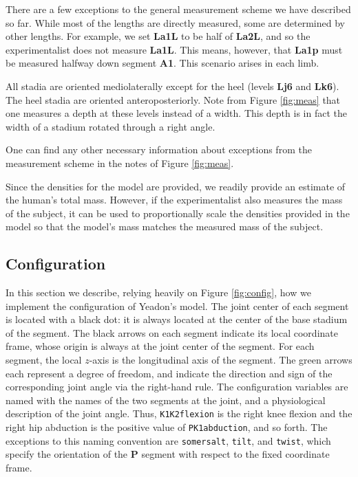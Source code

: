 \documentclass[10pt]{article}
\begin{document}
There are a few exceptions to the general measurement scheme we have described
so far. While most of the lengths are directly measured, some are determined by
other lengths. For example, we set \textbf{La1L} to be half of \textbf{La2L},
and so the experimentalist does not measure \textbf{La1L}. This means, however,
that \textbf{La1p} must be measured halfway down segment \textbf{A1}. This
scenario arises in each limb.

All stadia are oriented mediolaterally except for the heel (levels
\textbf{Lj6} and \textbf{Lk6}). The heel stadia are oriented anteroposteriorly.
Note from Figure \ref{fig:meas} that one measures a depth at these levels
instead of a width. This depth is in fact the width of a stadium rotated
through a right angle.

One can find any other necessary information about exceptions from the
measurement scheme in the notes of Figure \ref{fig:meas}.

Since the densities for the model are provided, we readily provide an estimate
of the human's total mass. However, if the experimentalist also measures the
mass of the subject, it can be used to proportionally scale the densities
provided in the model so that the model's mass matches the measured mass of the
subject.

\subsection*{Configuration}

In this section we describe, relying heavily on Figure \ref{fig:config}, how we
implement the configuration of Yeadon's model. The joint center of each
segment is located with a black dot: it is always located at the center of the
base stadium of the segment. The black arrows on each segment indicate its
local coordinate frame, whose origin is always at the joint center of the
segment. For each segment, the local $z$-axis is the longitudinal axis of the
segment. The green arrows each represent a degree of freedom, and indicate the
direction and sign of the corresponding joint angle via the right-hand rule.
The configuration variables are named with the names of the two segments at
the joint, and a physiological description of the joint angle. Thus,
\verb+K1K2flexion+ is the right knee flexion and the right hip abduction is the
positive value of \verb+PK1abduction+, and so forth. The exceptions to this
naming convention are \verb+somersalt+, \verb+tilt+, and \verb+twist+, which
specify the orientation of the \textbf{P} segment with respect to the fixed
coordinate frame.
\end{document}
